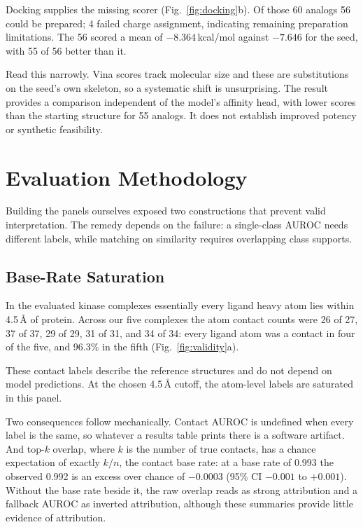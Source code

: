 \documentclass{ieeeaccess}
\begin{document}
Docking supplies the missing scorer (Fig.~\ref{fig:docking}b). Of those 60
analogs 56 could be prepared; 4 failed charge assignment, indicating remaining
preparation limitations. The 56 scored a mean of $-8.364$\,kcal/mol against $-7.646$ for the
seed, with 55 of 56 better than it.

Read this narrowly. Vina scores track molecular size and these are substitutions
on the seed's own skeleton, so a systematic shift is unsurprising. The result
provides a comparison independent of the model's affinity head, with lower
scores than the starting structure for 55 analogs. It does not establish
improved potency or synthetic feasibility.

\section{Evaluation Methodology}
\label{sec:evalmethod}
Building the panels ourselves exposed two constructions that prevent valid
interpretation. The remedy depends on the failure: a single-class AUROC needs
different labels, while matching on similarity requires overlapping class supports.

\subsection{Base-Rate Saturation}
In the evaluated kinase complexes essentially every ligand heavy atom lies
within 4.5\,\AA{} of protein. Across our five complexes the atom contact counts
were 26 of 27, 37 of 37, 29 of 29, 31 of 31, and 34 of 34: every ligand atom was
a contact in four of the five, and 96.3\% in the fifth
(Fig.~\ref{fig:validity}a).

These contact labels describe the reference structures and do not depend on
model predictions. At the chosen 4.5\,\AA{} cutoff, the atom-level labels are
saturated in this panel.

Two consequences follow mechanically. Contact AUROC is undefined when every
label is the same, so whatever a results table prints there is a software
artifact. And top-$k$ overlap, where $k$ is the number of true contacts, has a
chance expectation of exactly $k/n$, the contact base rate: at a base rate of
0.993 the observed 0.992 is an excess over chance of $-0.0003$ (95\% CI
$-0.001$ to $+0.001$). Without the base rate beside it, the raw overlap reads as
strong attribution and a fallback AUROC as inverted attribution, although
these summaries provide little evidence of attribution.
\end{document}
